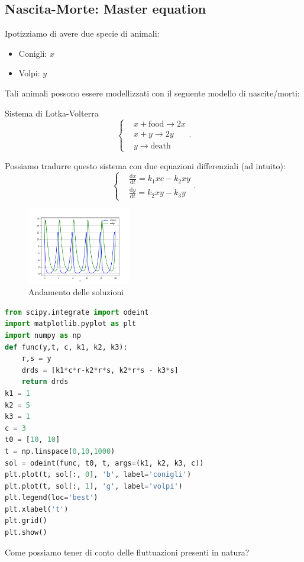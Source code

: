 \subsection{Nascita-Morte: Master equation}%
Ipotizziamo di avere due specie di animali:
\begin{itemize}
    \item Conigli: $x$ 
    \item Volpi: $y$ 
\end{itemize}
Tali animali possono essere modellizzati con il seguente modello di nascite/morti:
\begin{greenbox}{Sistema di Lotka-Volterra}
 \[
    \begin{cases}
	&x+\text{food}\to 2x\\
	&x+y\to 2y\\
	&y\to \text{death}
    \end{cases}
.\]    
\end{greenbox}
\noindent
Possiamo tradurre questo sistema con due equazioni differenziali (ad intuito):
\[
    \begin{cases}
	&\frac{\text{d} x}{\text{d} t} =k_1xc-k_2xy\\
	&\frac{\text{d} y}{\text{d} t} = k_2xy-k_3y
    \end{cases}
.\] 
\begin{figure}[H]
    \centering
    \includegraphics[width=0.4\textwidth]{figures/Volpi-Conigli.png}
    \caption{\scriptsize Andamento delle soluzioni}
    \label{fig:conigli}
\end{figure}
\begin{lstlisting}[language=Python]
from scipy.integrate import odeint
import matplotlib.pyplot as plt
import numpy as np
def func(y,t, c, k1, k2, k3):
    r,s = y 
    drds = [k1*c*r-k2*r*s, k2*r*s - k3*s]
    return drds
k1 = 1
k2 = 5
k3 = 1
c = 3
t0 = [10, 10]
t = np.linspace(0,10,1000)
sol = odeint(func, t0, t, args=(k1, k2, k3, c))
plt.plot(t, sol[:, 0], 'b', label='conigli')
plt.plot(t, sol[:, 1], 'g', label='volpi')
plt.legend(loc='best')
plt.xlabel('t')
plt.grid()
plt.show()
\end{lstlisting}
Come possiamo tener di conto delle fluttuazioni presenti in natura?\\
